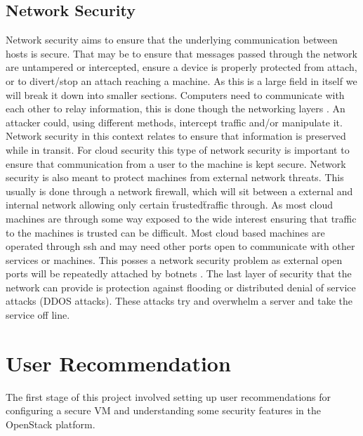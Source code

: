 \documentclass[12pt]{article}
\begin{document}
\subsection{Network Security}
Network security aims to ensure that the underlying communication between hosts is secure. That may be to ensure that messages passed through the network are untampered or intercepted, ensure a device is properly protected from attach, or to divert/stop an attach reaching a machine. As this is a large field in itself we will break it down into smaller sections. Computers need to communicate with each other to relay information, this is done though the networking layers \cite{wiki:osiModel}. An attacker could, using different methods, intercept traffic and/or manipulate it. Network security in this context relates to ensure that information is preserved while in transit. For cloud security this type of network security is important to ensure that communication from a user to the machine is kept secure. Network security is also meant to protect machines from external network threats. This usually is done through a network firewall, which will sit between a external and internal network allowing only certain \"trusted\" traffic through. As most cloud machines are through some way exposed to the wide interest ensuring that traffic to the machines is trusted can be difficult. Most cloud based machines are operated through ssh and may need other ports open to communicate with other services or machines. This posses a network security problem as external open ports will be repeatedly attached by botnets \cite{wiki:botnets}. The last layer of security that the network can provide is protection against flooding or distributed denial of service attacks (DDOS attacks). These attacks try and overwhelm a server and take the service off line.

\section{User Recommendation}
The first stage of this project involved setting up user recommendations for configuring a secure VM and understanding some security features in the OpenStack platform.
\end{document}

